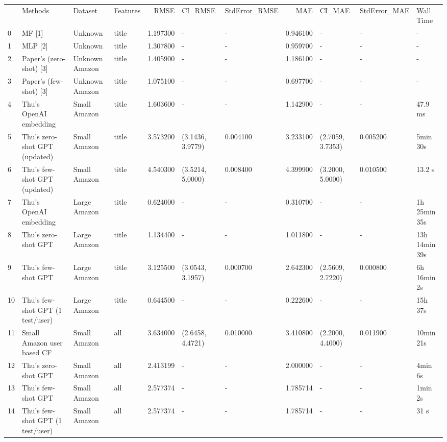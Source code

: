 \begin{tabular}{llllrllrlll}
 & Methods & Dataset & Features & RMSE & CI_RMSE & StdError_RMSE & MAE & CI_MAE & StdError_MAE & Wall Time \\
0 & MF [1] & Unknown & title & 1.197300 & - & - & 0.946100 & - & - & - \\
1 & MLP [2] & Unknown & title & 1.307800 & - & - & 0.959700 & - & - & - \\
2 & Paper's (zero-shot) [3] & Unknown Amazon & title & 1.405900 & - & - & 1.186100 & - & - & - \\
3 & Paper's (few-shot) [3] & Unknown Amazon & title & 1.075100 & - & - & 0.697700 & - & - & - \\
4 & Thu's OpenAI embedding & Small Amazon & title & 1.603600 & - & - & 1.142900 & - & - & 47.9 ms \\
5 & Thu's zero-shot GPT (updated) & Small Amazon & title & 3.573200 & (3.1436, 3.9779) & 0.004100 & 3.233100 & (2.7059, 3.7353) & 0.005200 & 5min 30s \\
6 & Thu's few-shot GPT (updated) & Small Amazon & title & 4.540300 & (3.5214, 5.0000) & 0.008400 & 4.399900 & (3.2000, 5.0000) & 0.010500 & 13.2 s \\
7 & Thu's OpenAI embedding & Large Amazon & title & 0.624000 & - & - & 0.310700 & - & - & 1h 25min 35s \\
8 & Thu's zero-shot GPT & Large Amazon & title & 1.134400 & - & - & 1.011800 & - & - & 13h 14min 39s \\
9 & Thu's few-shot GPT & Large Amazon & title & 3.125500 & (3.0543, 3.1957) & 0.000700 & 2.642300 & (2.5609, 2.7220) & 0.000800 & 6h 16min 2s \\
10 & Thu's few-shot GPT (1 test/user) & Large Amazon & title & 0.644500 & - & - & 0.222600 & - & - & 15h 37s \\
11 & Small Amazon user based CF & Small Amazon & all & 3.634000 & (2.6458, 4.4721) & 0.010000 & 3.410800 & (2.2000, 4.4000) & 0.011900 & 10min 21s \\
12 & Thu's zero-shot GPT & Small Amazon & all & 2.413199 & - & - & 2.000000 & - & - & 4min 6s \\
13 & Thu's few-shot GPT & Small Amazon & all & 2.577374 & - & - & 1.785714 & - & - & 1min 2s \\
14 & Thu's few-shot GPT (1 test/user) & Small Amazon & all & 2.577374 & - & - & 1.785714 & - & - & 31 s \\
\end{tabular}
